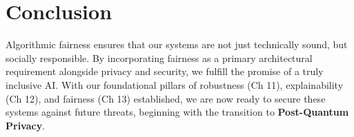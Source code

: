 \section{Conclusion}
\label{sec:conclusion_fairness}

Algorithmic fairness ensures that our systems are not just technically sound, but socially responsible. By incorporating fairness as a primary architectural requirement alongside privacy and security, we fulfill the promise of a truly inclusive AI. With our foundational pillars of robustness (Ch 11), explainability (Ch 12), and fairness (Ch 13) established, we are now ready to secure these systems against future threats, beginning with the transition to \textbf{Post-Quantum Privacy}.


